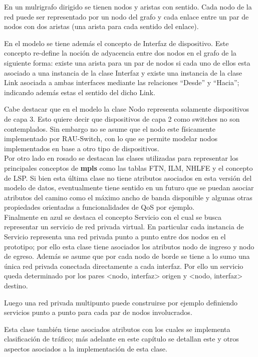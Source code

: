 \newpage
En un mulrigrafo dirigido se tienen nodos y aristas con sentido. Cada nodo de la red puede ser representado por un nodo del grafo y cada enlace entre un par de nodos con dos aristas (una arista para cada sentido del enlace).

En el modelo se tiene adem\'as el concepto de Interfaz de dispositivo. Este concepto re-define la noción de adyacencia entre dos nodos en el grafo de la siguiente forma: existe una arista para un par de nodos si cada uno de ellos esta asociado a una instancia de la clase Interfaz y existe una instancia de la clase Link asociada a ambas interfaces mediante las relaciones “Desde” y “Hacia”; indicando adem\'as estas el sentido del dicho Link.

Cabe destacar que en el modelo la clase Nodo representa solamente dispositivos de capa 3. Esto quiere decir que dispositivos de capa 2 como switches no son contemplados. Sin embargo no se asume que el nodo este f\'isicamente implementado por RAU-Switch, con lo que se permite modelar nodos implementados en base a otro tipo de dispositivos.\\

Por otro lado en rosado se destacan las clases utilizadas para representar los principales conceptos de \textbf{mpls} como las tablas FTN, ILM, NHLFE y el concepto de LSP. Si bien esta \'ultima clase no tiene atributos asociados en esta versi\'on del modelo de datos, eventualmente tiene sentido en un futuro que se puedan asociar atributos del camino como el m\'aximo ancho de banda disponible y algunas otras propiedades orientadas a funcionalidades de QoS por ejemplo.\\

Finalmente en azul se destaca el concepto Servicio con el cual se busca representar un servicio de red privada virtual. En particular cada instancia de Servicio representa una red privada punto a punto entre dos nodos en el prototipo; por ello esta clase tiene asociados los atributos nodo de ingreso y nodo de egreso. Adem\'as se asume que por cada nodo de borde se tiene a lo sumo una \'unica red privada conectada directamente a cada interfaz. Por ello un servicio queda determinado por los pares <nodo, interfaz> origen y <nodo, interfaz> destino. 

Luego una red privada multipunto puede construirse por ejemplo definiendo servicios punto a punto para cada par de nodos involucrados.

Esta clase también tiene asociados atributos con los cuales se implementa clasificaci\'on de tr\'afico; m\'as adelante en este cap\'itulo se detallan este y otros aspectos asociados a la implementaci\'on de esta clase.\\

